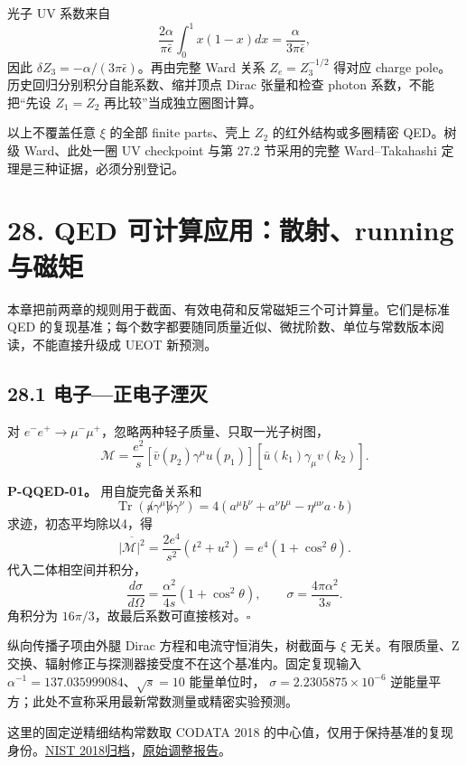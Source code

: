 \documentclass[
  11pt,
  oneside]{book}
\begin{document}
光子 UV 系数来自 \[
\frac{2\alpha}{\pi\bar\epsilon}\int_0^1x(1-x)dx
=\frac{\alpha}{3\pi\bar\epsilon},
\] 因此 \(\delta Z_3=-\alpha/(3\pi\bar\epsilon)\)。再由完整 Ward 关系
\(Z_e=Z_3^{-1/2}\) 得对应 charge
pole。历史回归分别积分自能系数、缩并顶点 Dirac 张量和检查 photon
系数，不能把``先设 \(Z_1=Z_2\) 再比较''当成独立圈图计算。

以上不覆盖任意 \(\xi\) 的全部 finite parts、壳上 \(Z_2\)
的红外结构或多圈精密 QED。树级 Ward、此处一圈 UV checkpoint 与第 27.2
节采用的完整 Ward--Takahashi 定理是三种证据，必须分别登记。

\chapter{28. QED 可计算应用：散射、running 与磁矩}\label{ch-28}\hypertarget{ch-28}{}

本章把前两章的规则用于截面、有效电荷和反常磁矩三个可计算量。它们是标准
QED
的复现基准；每个数字都要随同质量近似、微扰阶数、单位与常数版本阅读，不能直接升级成
UEOT 新预测。

\section{28.1 电子---正电子湮灭}

对 \(e^-e^+\to\mu^-\mu^+\)，忽略两种轻子质量、只取一光子树图， \[
\mathcal M=\frac{e^2}{s}
[\bar v(p_2)\gamma^\mu u(p_1)]
[\bar u(k_1)\gamma_\mu v(k_2)].
\] \protect\hypertarget{p-qqed-01}{}{}

\textbf{P-QQED-01。} 用自旋完备关系和 \[
\operatorname{Tr}(\not a\gamma^\mu\not b\gamma^\nu)
=4(a^\mu b^\nu+a^\nu b^\mu-\eta^{\mu\nu}a\cdot b)
\] 求迹，初态平均除以4，得 \[
\overline{|\mathcal M|^2}=\frac{2e^4}{s^2}(t^2+u^2)
=e^4(1+\cos^2\theta).
\] 代入二体相空间并积分， \[
\frac{d\sigma}{d\Omega}=\frac{\alpha^2}{4s}(1+\cos^2\theta),
\qquad \sigma=\frac{4\pi\alpha^2}{3s}.
\] 角积分为 \(16\pi/3\)，故最后系数可直接核对。\(\square\)

纵向传播子项由外腿 Dirac 方程和电流守恒消失，树截面与 \(\xi\)
无关。有限质量、Z
交换、辐射修正与探测器接受度不在这个基准内。固定复现输入
\(\alpha^{-1}=137.035999084\)、\(\sqrt s=10\) 能量单位时，
\(\sigma=2.2305875\times10^{-6}\)
逆能量平方；此处不宣称采用最新常数测量或精密实验预测。

这里的固定逆精细结构常数取 CODATA 2018
的中心值，仅用于保持基准的复现身份。\href{https://physics.nist.gov/cuu/Constants/archive2018.html}{NIST
2018归档}，\href{https://doi.org/10.1103/RevModPhys.93.025010}{原始调整报告}。
\end{document}
